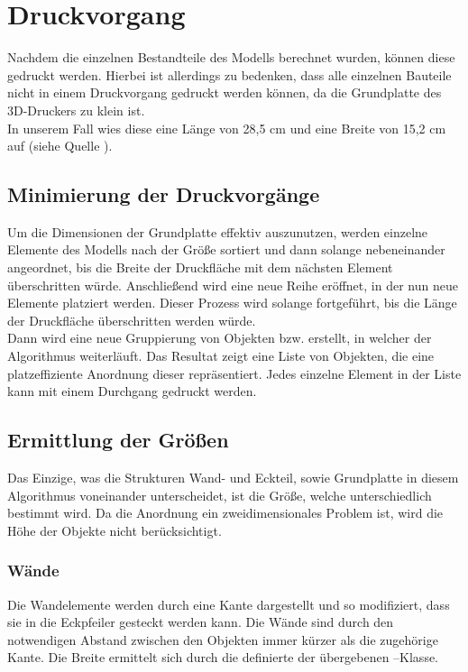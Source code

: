 \section{Druckvorgang}
Nachdem die einzelnen Bestandteile des Modells berechnet wurden, können diese gedruckt werden.
Hierbei ist allerdings zu bedenken, dass alle einzelnen Bauteile nicht in einem Druckvorgang gedruckt werden können, da die Grundplatte des 3D-Druckers zu klein ist. \\
In unserem Fall wies diese eine Länge von 28,5 cm und eine Breite von 15,2 cm auf (siehe Quelle \cite{makerbotspecs}).

\subsection{Minimierung der Druckvorgänge}
Um die Dimensionen der Grundplatte effektiv auszunutzen, werden einzelne Elemente des Modells nach der Größe sortiert und dann solange nebeneinander angeordnet, bis die Breite der Druckfläche mit dem nächsten Element überschritten würde.
Anschließend wird eine neue Reihe eröffnet, in der nun neue Elemente platziert werden. 
Dieser Prozess wird solange fortgeführt, bis die Länge der Druckfläche überschritten werden würde. \\
Dann wird eine neue Gruppierung von Objekten bzw.  erstellt, in welcher der Algorithmus weiterläuft.
Das Resultat zeigt eine Liste von Objekten, die eine platzeffiziente Anordnung dieser repräsentiert.
Jedes einzelne Element in der Liste kann mit einem Durchgang gedruckt werden.

\subsection{Ermittlung der Größen}
Das Einzige, was die Strukturen Wand- und Eckteil, sowie Grundplatte in diesem Algorithmus voneinander unterscheidet, ist die Größe, welche unterschiedlich bestimmt wird.
Da die Anordnung ein zweidimensionales Problem ist, wird die Höhe der Objekte nicht berücksichtigt.

\subsubsection{Wände}
Die Wandelemente werden durch eine Kante dargestellt und so modifiziert, dass sie in die Eckpfeiler gesteckt werden kann.
Die Wände sind durch den notwendigen Abstand zwischen den Objekten immer kürzer als die zugehörige Kante. 
Die Breite ermittelt sich durch die definierte  der übergebenen --Klasse.

